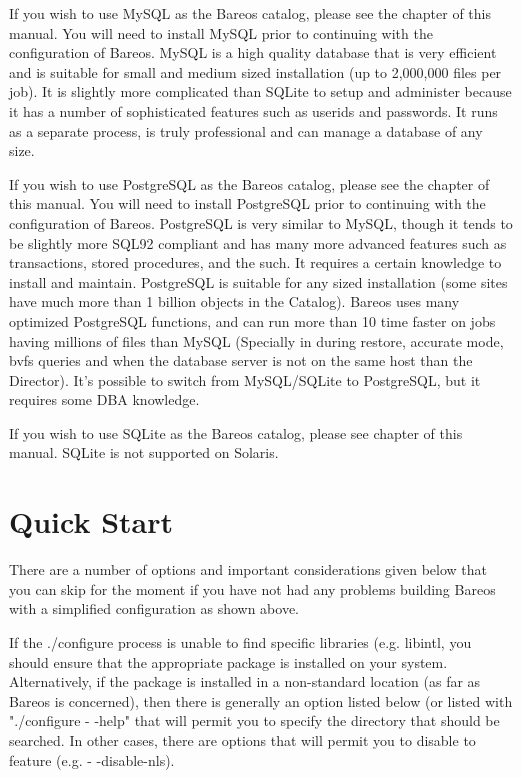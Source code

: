 If you wish to use MySQL as the Bareos catalog, please see the
 chapter of this
manual. You will need to install MySQL prior to continuing with the
configuration of Bareos. MySQL is a high quality database that is very
efficient and is suitable for small and medium sized installation (up to
2,000,000 files per job). It is slightly more complicated than SQLite to setup
and administer because it has a number of sophisticated features such as
userids and passwords. It runs as a separate process, is truly professional and
can manage a database of any size.

If you wish to use PostgreSQL as the Bareos catalog, please see the
 chapter of
this manual. You will need to install PostgreSQL prior to continuing with the
configuration of Bareos. PostgreSQL is very similar to MySQL, though it tends
to be slightly more SQL92 compliant and has many more advanced features such as
transactions, stored procedures, and the such. It requires a certain knowledge
to install and maintain. PostgreSQL is suitable for any sized installation
(some sites have much more than 1 billion objects in the Catalog). Bareos uses
many optimized PostgreSQL functions, and can run more than 10 time faster on
jobs having millions of files than MySQL (Specially in during restore, accurate
mode, bvfs queries and when the database server is not on the same host than
the Director). It's possible to switch from MySQL/SQLite to PostgreSQL, but it
requires some DBA knowledge.

If you wish to use SQLite as the Bareos catalog, please see
 chapter of
this manual. SQLite is not supported on Solaris.

\section{Quick Start}

There are a number of options and important considerations given below
that you can skip for the moment if you have not had any problems building
Bareos with a simplified configuration as shown above.

If the ./configure process is unable to find specific libraries (e.g.
libintl, you should ensure that the appropriate package is installed on
your system. Alternatively, if the package is installed in a non-standard
location (as far as Bareos is concerned), then there is generally an
option listed below (or listed with "./configure {-} {-}help" that will
permit you to specify the directory that should be searched. In other
cases, there are options that will permit you to disable to feature
(e.g. {-} {-}disable-nls).


